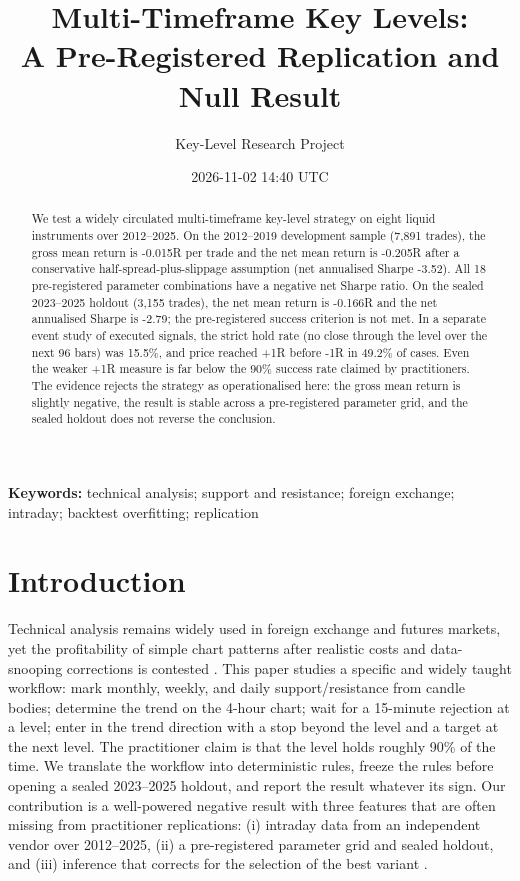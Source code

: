 \documentclass[11pt,a4paper]{article}
\title{Multi-Timeframe Key Levels:\\ A Pre-Registered Replication and Null Result}
\author{Key-Level Research Project}
\date{2026-11-02 14:40 UTC}
\begin{document}
\maketitle
\begin{abstract}
We test a widely circulated multi-timeframe key-level strategy on eight liquid instruments over 2012--2025. On the 2012--2019 development sample (7,891 trades), the gross mean return is -0.015R per trade and the net mean return is -0.205R after a conservative half-spread-plus-slippage assumption (net annualised Sharpe -3.52). All 18 pre-registered parameter combinations have a negative net Sharpe ratio. On the sealed 2023--2025 holdout (3,155 trades), the net mean return is -0.166R and the net annualised Sharpe is -2.79; the pre-registered success criterion is not met. In a separate event study of executed signals, the strict hold rate (no close through the level over the next 96 bars) was 15.5\%, and price reached +1R before -1R in 49.2\% of cases. Even the weaker +1R measure is far below the 90\% success rate claimed by practitioners. The evidence rejects the strategy as operationalised here: the gross mean return is slightly negative, the result is stable across a pre-registered parameter grid, and the sealed holdout does not reverse the conclusion.
\end{abstract}
\noindent\textbf{Keywords:} technical analysis; support and resistance; foreign exchange; intraday; backtest overfitting; replication

\section{Introduction}
Technical analysis remains widely used in foreign exchange and futures markets, yet the profitability of simple chart patterns after realistic costs and data-snooping corrections is contested \citep{brock1992simple,lo2000foundations,menkhoff2007obstinate,osler2003currency}. This paper studies a specific and widely taught workflow: mark monthly, weekly, and daily support/resistance from candle bodies; determine the trend on the 4-hour chart; wait for a 15-minute rejection at a level; enter in the trend direction with a stop beyond the level and a target at the next level. The practitioner claim is that the level holds roughly 90\% of the time. We translate the workflow into deterministic rules, freeze the rules before opening a sealed 2023--2025 holdout, and report the result whatever its sign.
Our contribution is a well-powered negative result with three features that are often missing from practitioner replications: (i) intraday data from an independent vendor over 2012--2025, (ii) a pre-registered parameter grid and sealed holdout, and (iii) inference that corrects for the selection of the best variant \citep{bailey2014deflated,bailey2017probability,white2000reality,hansen2005test}.
\end{document}
